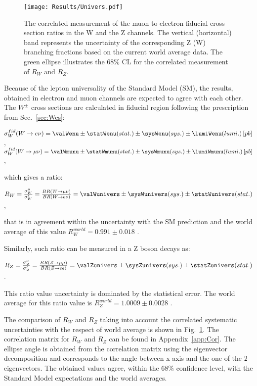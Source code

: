 \begin{figure}[!tb]
\begin{center}
\begin{minipage}[h]{0.8\linewidth}
\texttt{[image: Results/Univers.pdf]}
\end{minipage}
\caption{The correlated measurement of the muon-to-electron fiducial cross section ratios in the W and the Z channels. The vertical (horizontal) band represents the uncertainty of the corresponding Z (W) branching fractions based on the current world average data. The green ellipse illustrates the 68\% CL for the correlated measurement of $R_W$ and $R_Z$.}
\label{fig:LeptUnivers}
\end{center}
\end{figure}


Because of the lepton universality of the Standard Model (SM), the results, obtained in electron and muon channels are expected to agree with each other. The $W^{\pm}$ cross sections are calculated in fiducial region following the prescription from Sec.~\ref{sec:Wcs}:
\begin{center}
$\sigma^{fid}_{W}(\wenu) = \valWenu  \pm \statWenu (stat.) \pm \sysWenu (sys.) \pm \lumiWenu (lumi.) \, [pb]$,\\
$\sigma^{fid}_{W}(\wmunu) = \valWmunu  \pm \statWmunu (stat.) \pm \sysWmunu (sys.) \pm \lumiWmunu (lumi.) \, [pb]$,
\end{center} 
which gives a ratio:
\begin{center}
$R_{W}=\frac{\sigma^{\mu}_W}{\sigma^{e}_W} = \frac{BR(\wmunu)}{BR(\wenu)}= \valWunivers \pm \sysWunivers (sys.) \pm \statWunivers (stat.)$,
\end{center}
that is in agreement within the uncertainty with the SM prediction and the world average of this value  $R^{world}_W=0.991\pm0.018$ \cite{Agashe:2014kda}. 

Similarly, such ratio can be measured in a Z boson decays as:
\begin{center}
$R_{Z}=\frac{\sigma^{\mu}_Z}{\sigma^{e}_Z} = \frac{BR(Z\to \mu\mu)}{BR(Z \to ee)}= \valZunivers \pm \sysZunivers(sys.) \pm \statZunivers (stat.)$.
\end{center}
This ratio value uncertainty is dominated by the statistical error. The world average for this ratio value is $R^{world}_Z=1.0009 \pm 0.0028$ \cite{Agashe:2014kda}. 

The comparison of $R_W$ and $R_Z$ taking into account the correlated systematic uncertainties with the respect of world average is shown in Fig.~\ref{fig:LeptUnivers}. The correlation matrix for $R_W$ and $R_Z$ can be found in Appendix~\ref{app:Cor}. The ellipse angle is obtained from the correlation matrix using the eigenvector decomposition and corresponds to the angle between x axis and the one of the 2 eigenvectors. The obtained values agree, within the 68\% confidence level, with the Standard Model expectations and the world averages.




